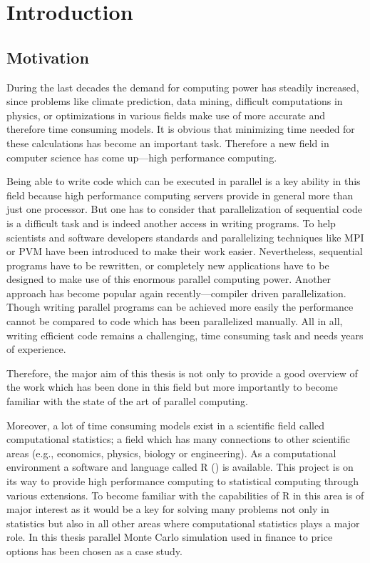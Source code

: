 
\clearpage
\pagestyle{headings}
\chapter{Introduction}

\setcounter{page}{1}

\section{Motivation}
During the last decades the demand for computing power has steadily
increased, since problems like climate prediction, data mining, difficult
computations in physics, or optimizations in various fields
make use of more accurate and therefore time consuming models. It is
obvious that minimizing time needed for these calculations has become
an important task. Therefore a new field in computer science has come
up---high performance computing.

Being able to write code which can be executed in parallel is a key
ability in this field because high performance computing servers
provide in general more than just one processor. But one has to
consider that
parallelization of sequential code is a difficult task and is indeed
another access in writing programs. To help scientists and software
developers standards and parallelizing techniques like MPI or PVM have
been introduced 
to make their work easier. Nevertheless, sequential programs have to
be rewritten, or completely new applications have to be designed to
make use of this enormous parallel computing power. Another approach
has become popular again recently---compiler driven
parallelization. Though writing parallel programs can be achieved
more easily the performance cannot be compared to code which has been
parallelized manually. All in all,
writing efficient code remains a challenging, time consuming task and
needs years of experience. 

Therefore, the major aim of this thesis is not only to 
provide a good overview of the work which has been done in this field
but more importantly to become familiar with the state of the art of
parallel computing.

Moreover, a lot of  time consuming models exist in a scientific field
called computational statistics; a field which has many connections to other
scientific areas (e.g., economics, physics, biology or
engineering). As a computational environment a software and language
called
R (\cite{Rcore07R}) is available. This project is on its way to provide 
high performance computing to statistical computing  through various
extensions. To become familiar with the capabilities of R in
this area is of major interest as it would be a key for solving many
problems not only in statistics but also in all other areas where
computational statistics plays a major role. In this thesis parallel
Monte Carlo simulation used in finance to price options has been
chosen as a case study.

